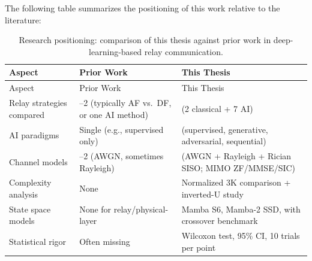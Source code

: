 The following table summarizes the positioning of this work relative to the literature:

\begin{longtable}[]{@{}
  >{\raggedright\arraybackslash}p{}
  >{\raggedright\arraybackslash}p{}
  >{\raggedright\arraybackslash}p{}@{}}
\caption{Research positioning: comparison of this thesis against prior work in deep-learning-based relay communication.}\label{tbl:table17}\tabularnewline
\toprule\noalign{}
\begin{minipage}[b]{\linewidth}\raggedright
Aspect
\end{minipage} & \begin{minipage}[b]{\linewidth}\raggedright
Prior Work
\end{minipage} & \begin{minipage}[b]{\linewidth}\raggedright
This Thesis
\end{minipage} \\
\midrule\noalign{}
\endfirsthead
\toprule\noalign{}
\begin{minipage}[b]{\linewidth}\raggedright
Aspect
\end{minipage} & \begin{minipage}[b]{\linewidth}\raggedright
Prior Work
\end{minipage} & \begin{minipage}[b]{\linewidth}\raggedright
This Thesis
\end{minipage} \\
\midrule\noalign{}
\endhead
\bottomrule\noalign{}
\endlastfoot
Relay strategies compared & 1--2 (typically AF vs.~DF, or one AI method) & 9 (2 classical + 7 AI) \\
AI paradigms & Single (e.g., supervised only) & 4 (supervised, generative, adversarial, sequential) \\
Channel models & 1--2 (AWGN, sometimes Rayleigh) & 6 (AWGN + Rayleigh + Rician SISO; MIMO ZF/MMSE/SIC) \\
Complexity analysis & None & Normalized 3K comparison + inverted-U study \\
State space models & None for relay/physical-layer & Mamba S6, Mamba-2 SSD, with crossover benchmark \\
Statistical rigor & Often missing & Wilcoxon test, 95\% CI, 10 trials per point \\
\end{longtable}

